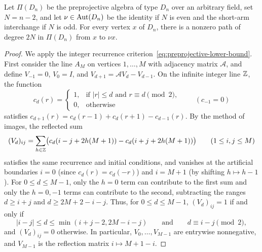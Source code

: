 \begin{lemma}
\label{lem:d-top-paths}
Let $\Pi(D_n)$ be the preprojective algebra of type $D_n$ over an arbitrary field, set $N=n-2$, and let $\nu\in\operatorname{Aut}(D_n)$ be the identity if $N$ is even and the short-arm interchange if $N$ is odd. For every vertex $x$ of $D_n$, there is a nonzero path of degree $2N$ in $\Pi(D_n)$ from $x$ to $\nu x$.
\end{lemma}
\begin{proof}
We apply the integer recurrence criterion~\eqref{eq:preprojective-lower-bound}. First consider the line $A_M$ on vertices $1,\ldots,M$ with adjacency matrix $\mathcal A$, and define $V_{-1}=0$, $V_0=I$, and $V_{d+1}=\mathcal AV_d-V_{d-1}$. On the infinite integer line $\mathbb Z$, the function
\[
  c_d(r)=\begin{cases}
    1,&\text{if }|r|\leq d\text{ and }r\equiv d\pmod2,\\
    0,&\text{otherwise}
  \end{cases}
  \qquad(c_{-1}=0)
\]
satisfies $c_{d+1}(r)=c_d(r-1)+c_d(r+1)-c_{d-1}(r)$. By the method of images, the reflected sum
\[
  (V_d)_{ij}=\sum_{h\in\mathbb Z}\bigl(c_d(i-j+2h(M+1))-c_d(i+j+2h(M+1))\bigr)\qquad(1\leq i,j\leq M)
\]
satisfies the same recurrence and initial conditions, and vanishes at the artificial boundaries $i=0$ (since $c_d(r)=c_d(-r)$) and $i=M+1$ (by shifting $h\mapsto h-1$). For $0\leq d\leq M-1$, only the $h=0$ term can contribute to the first sum and only the $h=0,-1$ terms can contribute to the second, subtracting the ranges $d\geq i+j$ and $d\geq2M+2-i-j$. Thus, for $0\leq d\leq M-1$, $(V_d)_{ij}=1$ if and only if
\[
  |i-j|\leq d\leq\min(i+j-2,2M-i-j)\qquad\text{and}\qquad d\equiv i-j\pmod2,
\]
and $(V_d)_{ij}=0$ otherwise. In particular, $V_0,\ldots,V_{M-1}$ are entrywise nonnegative, and $V_{M-1}$ is the reflection matrix $i\mapsto M+1-i$.


\end{proof}
